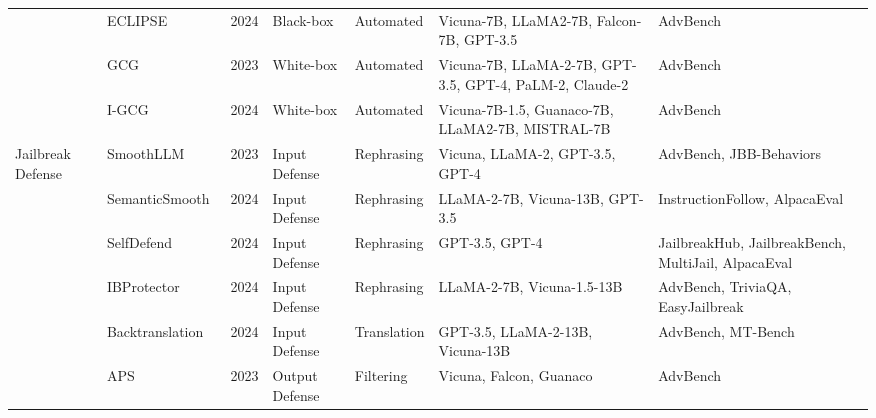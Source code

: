 \begin{table*}[htp]
{\begin{tabular}{p{}p{}p{}p{}p{}p{}p{}}
& \cellcolor{white} ECLIPSE~\cite{jiang2024unlocking} &
\cellcolor{white} 2024 &
\cellcolor{white} Black-box &
\cellcolor{white} Automated &
\cellcolor{white} Vicuna-7B, LLaMA2-7B, Falcon-7B, GPT-3.5 &
\cellcolor{white} AdvBench \\
& \cellcolor{gray!15!}GCG~\cite{zou2023universal} & \cellcolor{gray!15!}2023 & \cellcolor{gray!15!}White-box & \cellcolor{gray!15!}Automated & \cellcolor{gray!15!}Vicuna-7B, LLaMA-2-7B, GPT-3.5, GPT-4, PaLM-2, Claude-2 & \cellcolor{gray!15!}AdvBench  \\
& \cellcolor{white}I-GCG \cite{jia2024improved} & \cellcolor{white}2024 & \cellcolor{white}White-box & \cellcolor{white}Automated & \cellcolor{white}Vicuna-7B-1.5, Guanaco-7B, LLaMA2-7B, MISTRAL-7B & \cellcolor{white}AdvBench\\
\hline
\multirow{12}{0.1\textwidth}{Jailbreak Defense} & \cellcolor{gray!15!}SmoothLLM~\cite{robey2023smoothllm} & \cellcolor{gray!15!}2023 & \cellcolor{gray!15!}Input Defense & \cellcolor{gray!15!}Rephrasing & \cellcolor{gray!15!}Vicuna, LLaMA-2, GPT-3.5, GPT-4 & \cellcolor{gray!15!}AdvBench, JBB-Behaviors \\
& \cellcolor{white}SemanticSmooth~\cite{ji2024defending} & \cellcolor{white}2024 & \cellcolor{white}Input Defense & \cellcolor{white}Rephrasing & \cellcolor{white}LLaMA-2-7B, Vicuna-13B, GPT-3.5 & \cellcolor{white}InstructionFollow, AlpacaEval \\
& \cellcolor{gray!15!}SelfDefend~\cite{wang2024selfdefend} & \cellcolor{gray!15!}2024 & \cellcolor{gray!15!}Input Defense& \cellcolor{gray!15!}Rephrasing & \cellcolor{gray!15!}GPT-3.5, GPT-4 &  \cellcolor{gray!15!}JailbreakHub, JailbreakBench, MultiJail, AlpacaEval \\
& \cellcolor{white}IBProtector~\cite{liu2024protecting} & \cellcolor{white}2024 & \cellcolor{white}Input Defense& \cellcolor{white}Rephrasing & \cellcolor{white}LLaMA-2-7B, Vicuna-1.5-13B & \cellcolor{white}AdvBench, TriviaQA, EasyJailbreak \\
& \cellcolor{gray!15!}Backtranslation~\cite{wang2024defending} & \cellcolor{gray!15!}2024 & \cellcolor{gray!15!}Input Defense & \cellcolor{gray!15!}Translation & \cellcolor{gray!15!}GPT-3.5, LLaMA-2-13B, Vicuna-13B & \cellcolor{gray!15!}AdvBench, MT-Bench \\
& \cellcolor{white}APS~\cite{kim2023robust} & \cellcolor{white}2023 & \cellcolor{white}Output Defense& \cellcolor{white}Filtering & \cellcolor{white}Vicuna, Falcon, Guanaco & \cellcolor{white}AdvBench \\

\end{tabular}}
\end{table*}
